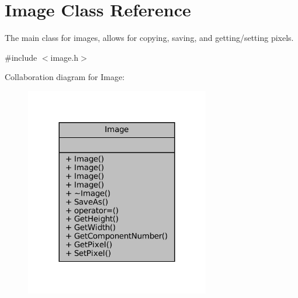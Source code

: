 \hypertarget{classImage}{}\section{Image Class Reference}
\label{classImage}


The main class for images, allows for copying, saving, and getting/setting pixels.  




{\ttfamily \#include $<$image.\+h$>$}



Collaboration diagram for Image\+:
\nopagebreak
\begin{figure}[H]
\begin{center}
\leavevmode
\includegraphics[width=228pt]{classImage__coll__graph}
\end{center}
\end{figure}
